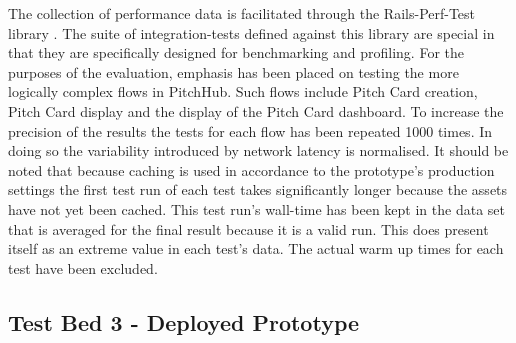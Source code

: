 The collection of performance data is facilitated through the Rails-Perf-Test library \cite{railsperftest:online}. The suite of integration-tests defined against this library are special in that they are specifically designed for benchmarking and profiling. For the purposes of the evaluation, emphasis has been placed on testing the more logically complex flows in PitchHub. Such flows include Pitch Card creation, Pitch Card display and the display of the Pitch Card dashboard. To increase the precision of the results the tests for each flow has been repeated 1000 times. In doing so the variability introduced by network latency is normalised. It should be noted that because caching is used in accordance to the prototype's production settings the first test run of each test takes significantly longer because the assets have not yet been cached. This test run's wall-time has been kept in the data set that is averaged for the final result because it is a valid run. This does present itself as an extreme value in each test's data. The actual warm up times for each test have been excluded.

\subsection{Test Bed 3 - Deployed Prototype}\label{SS:deployedPrototype}

